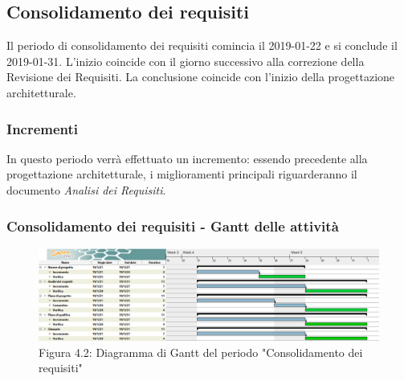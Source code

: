 \subsection{Consolidamento dei requisiti}
Il periodo di consolidamento dei requisiti comincia il 2019-01-22 e si conclude il 2019-01-31. L'inizio coincide con il giorno successivo alla correzione della Revisione dei Requisiti. La conclusione coincide con l'inizio della progettazione architetturale. 
\subsubsection{Incrementi}
In questo periodo verrà effettuato un incremento: essendo precedente alla progettazione architetturale, i miglioramenti principali riguarderanno il documento \emph{Analisi dei Requisiti}.

\subsubsection{Consolidamento dei requisiti - Gantt delle attività}

\begin{figure} [H]
	\centering
	\includegraphics[scale=0.35]{Res/Gantt/Consolidamento}
	\caption{Figura 4.2: Diagramma di Gantt del periodo "Consolidamento dei requisiti"}\label{}
\end{figure}

\pagebreak

